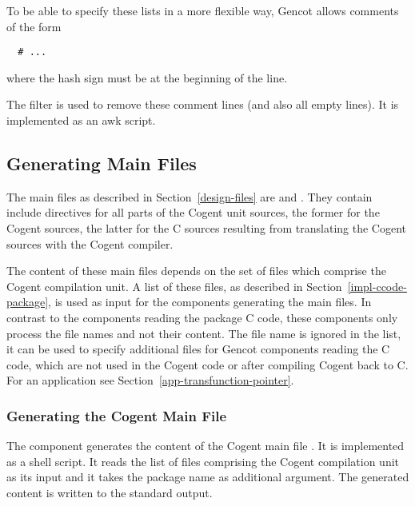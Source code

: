 To be able to specify these lists in a more flexible way, Gencot allows comments of the form
\begin{verbatim}
  # ...
\end{verbatim}
where the hash sign must be at the beginning of the line.

The filter  is used to remove these comment lines (and also all empty lines). It is implemented
as an awk script.

\subsection{Generating Main Files}
\label{impl-ocomps-main}

The main files as described in Section~\ref{design-files} are  and . They
contain include directives for all parts of the Cogent unit sources, the former for the Cogent sources, the latter 
for the C sources resulting from translating the Cogent sources with the Cogent compiler.

The content of these main files depends on the set of  files which comprise the Cogent compilation unit.
A list of these files, as described in Section~\ref{impl-ccode-package}, is used as input for the components generating
the main files. In contrast to the components reading the package C code, these components only process the file 
names and not their content. The file name  is ignored in the list, it can be used
to specify additional  files for Gencot components reading the C code, which are not used in the Cogent 
code or after compiling Cogent back to C. For an application see Section~\ref{app-transfunction-pointer}.

\subsubsection{Generating the Cogent Main File}

The component  generates the content of the Cogent main file . 
It is implemented as a shell script. It reads the list of
 files comprising the Cogent compilation unit as its input and it takes the package name 
as additional argument. The generated content is written to the standard output. 

